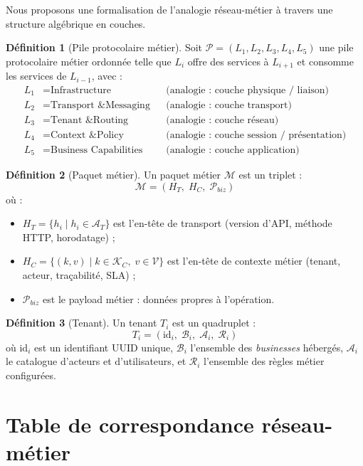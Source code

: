 \documentclass[12pt,a4paper]{report}
\theoremstyle{definition}
\newtheorem{definition}{Définition}[chapter]
\theoremstyle{remark}
\newcommand{\api}{\textsc{API}}
\begin{document}
Nous proposons une formalisation de l'analogie réseau-métier à travers une structure algébrique en couches.

\begin{definition}[Pile protocolaire métier]
	Soit $\mathcal{P} = (L_1, L_2, L_3, L_4, L_5)$ une pile protocolaire métier ordonnée telle que $L_i$ offre des services à $L_{i+1}$ et consomme les services de $L_{i-1}$, avec :
	\begin{align*}
		L_1 &= \text{Infrastructure} & &\text{(analogie : couche physique / liaison)} \\
		L_2 &= \text{Transport \& Messaging} & &\text{(analogie : couche transport)} \\
		L_3 &= \text{Tenant \& Routing} & &\text{(analogie : couche réseau)} \\
		L_4 &= \text{Context \& Policy} & &\text{(analogie : couche session / présentation)} \\
		L_5 &= \text{Business Capabilities} & &\text{(analogie : couche application)}
	\end{align*}
\end{definition}

\begin{definition}[Paquet métier]
	Un paquet métier $\mathcal{M}$ est un triplet :
	\[
	\mathcal{M} = (H_T,\; H_C,\; \mathcal{P}_{biz})
	\]
	où :
	\begin{itemize}
		\item $H_T = \{h_i \mid h_i \in \mathcal{A}_T\}$ est l'en-tête de transport (version d'\api, méthode HTTP, horodatage) ;
		\item $H_C = \{(k, v) \mid k \in \mathcal{K}_C,\; v \in \mathcal{V}\}$ est l'en-tête de contexte métier (tenant, acteur, traçabilité, SLA) ;
		\item $\mathcal{P}_{biz}$ est le payload métier : données propres à l'opération.
	\end{itemize}
\end{definition}

\begin{definition}[Tenant]
	Un tenant $T_i$ est un quadruplet :
	\[
	T_i = (\text{id}_i,\; \mathcal{B}_i,\; \mathcal{A}_i,\; \mathcal{R}_i)
	\]
	où $\text{id}_i$ est un identifiant UUID unique, $\mathcal{B}_i$ l'ensemble des \textit{businesses} hébergés, $\mathcal{A}_i$ le catalogue d'acteurs et d'utilisateurs, et $\mathcal{R}_i$ l'ensemble des règles métier configurées.
\end{definition}

\section{Table de correspondance réseau-métier}
\end{document}
